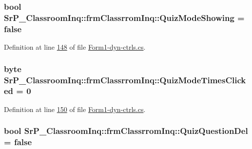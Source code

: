 \hypertarget{class_sr_p___classroom_inq_1_1frm_classrrom_inq_a2be9d2ea6cc1cabf0dc6c6f3ee2544ce}{
\subsubsection[{\-Quiz\-Mode\-Showing}]{\setlength{\rightskip}{0pt plus 5cm}bool {\bf \-Sr\-P\-\_\-\-Classroom\-Inq\-::frm\-Classrrom\-Inq\-::\-Quiz\-Mode\-Showing} = false}}
\label{class_sr_p___classroom_inq_1_1frm_classrrom_inq_a2be9d2ea6cc1cabf0dc6c6f3ee2544ce}


\-Definition at line \hyperlink{_form1-dyn-ctrls_8cs_source_l00148}{148} of file \hyperlink{_form1-dyn-ctrls_8cs_source}{\-Form1-\/dyn-\/ctrls.\-cs}.

\hypertarget{class_sr_p___classroom_inq_1_1frm_classrrom_inq_a0c88b881dc5ae86b5b3d5e04434b2ea8}{
\subsubsection[{\-Quiz\-Mode\-Times\-Clicked}]{\setlength{\rightskip}{0pt plus 5cm}byte {\bf \-Sr\-P\-\_\-\-Classroom\-Inq\-::frm\-Classrrom\-Inq\-::\-Quiz\-Mode\-Times\-Clicked} = 0}}
\label{class_sr_p___classroom_inq_1_1frm_classrrom_inq_a0c88b881dc5ae86b5b3d5e04434b2ea8}


\-Definition at line \hyperlink{_form1-dyn-ctrls_8cs_source_l00150}{150} of file \hyperlink{_form1-dyn-ctrls_8cs_source}{\-Form1-\/dyn-\/ctrls.\-cs}.

\hypertarget{class_sr_p___classroom_inq_1_1frm_classrrom_inq_aa1c6ba1dda756081aba5b3cfea87b09d}{
\subsubsection[{\-Quiz\-Question\-Del}]{\setlength{\rightskip}{0pt plus 5cm}bool {\bf \-Sr\-P\-\_\-\-Classroom\-Inq\-::frm\-Classrrom\-Inq\-::\-Quiz\-Question\-Del} = false}}
\label{class_sr_p___classroom_inq_1_1frm_classrrom_inq_aa1c6ba1dda756081aba5b3cfea87b09d}


